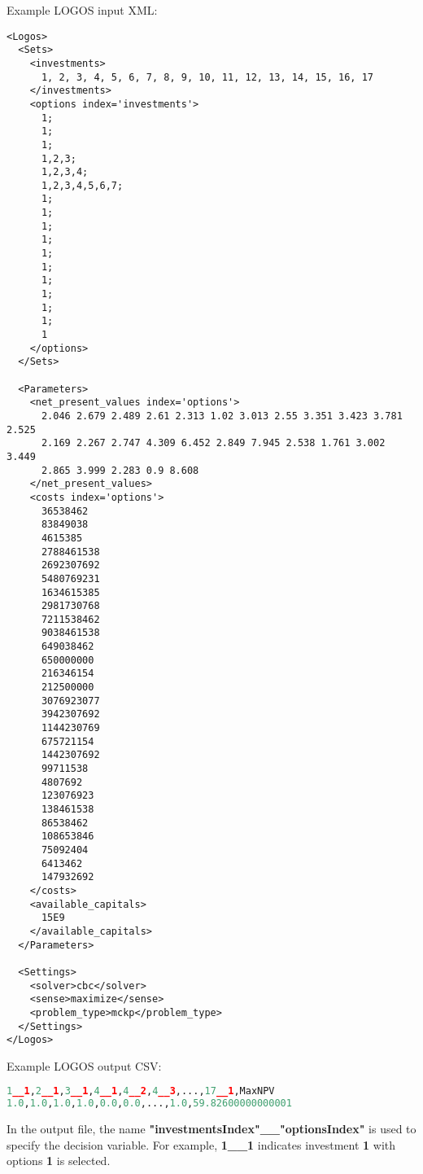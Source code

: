 Example LOGOS input XML:
\begin{lstlisting}[style=XML]
<Logos>
  <Sets>
    <investments>
      1, 2, 3, 4, 5, 6, 7, 8, 9, 10, 11, 12, 13, 14, 15, 16, 17
    </investments>
    <options index='investments'>
      1;
      1;
      1;
      1,2,3;
      1,2,3,4;
      1,2,3,4,5,6,7;
      1;
      1;
      1;
      1;
      1;
      1;
      1;
      1;
      1;
      1;
      1
    </options>
  </Sets>

  <Parameters>
    <net_present_values index='options'>
      2.046 2.679 2.489 2.61 2.313 1.02 3.013 2.55 3.351 3.423 3.781 2.525
      2.169 2.267 2.747 4.309 6.452 2.849 7.945 2.538 1.761 3.002 3.449
      2.865 3.999 2.283 0.9 8.608
    </net_present_values>
    <costs index='options'>
      36538462
      83849038
      4615385
      2788461538
      2692307692
      5480769231
      1634615385
      2981730768
      7211538462
      9038461538
      649038462
      650000000
      216346154
      212500000
      3076923077
      3942307692
      1144230769
      675721154
      1442307692
      99711538
      4807692
      123076923
      138461538
      86538462
      108653846
      75092404
      6413462
      147932692
    </costs>
    <available_capitals>
      15E9
    </available_capitals>
  </Parameters>

  <Settings>
    <solver>cbc</solver>
    <sense>maximize</sense>
    <problem_type>mckp</problem_type>
  </Settings>
</Logos>
\end{lstlisting}

Example LOGOS output CSV:
\begin{lstlisting}[language=python]
1__1,2__1,3__1,4__1,4__2,4__3,...,17__1,MaxNPV
1.0,1.0,1.0,1.0,0.0,0.0,...,1.0,59.82600000000001
\end{lstlisting}

In the output file, the name \textbf{"investmentsIndex"\_\_"optionsIndex"} is used to
specify the decision variable. For example, \textbf{1\_\_1} indicates investment \textbf{1}
with options \textbf{1} is selected.
